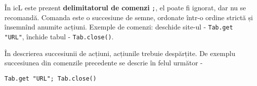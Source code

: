 În icL este prezent \textbf{delimitatorul de comenzi} \texttt{;}, el poate fi ignorat, dar nu se recomandă. Comanda este o succesiune de semne, ordonate într-o ordine strictă și însemnînd anumite acțiuni. Exemple de comenzi: deschide site-ul - \texttt{Tab.get "URL"}, închide tabul - \texttt{Tab.close()}.

În descrierea succesiunii de acțiuni, acțiunile trebuie despărțite. De exemplu succesiunea din comenzile precedente se descrie în felul următor -
\begin{verbatim}
Tab.get "URL"; Tab.close()
\end{verbatim}

\begin{sourcecode}
    \label{readable}
    \inputminted[linenos]{icl}{../sources/readable.icL}
\end{sourcecode}
